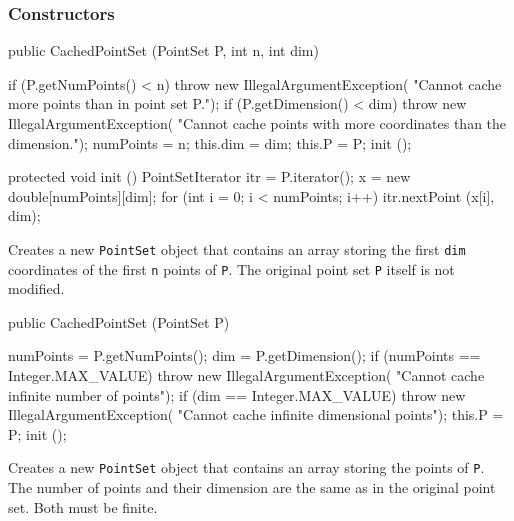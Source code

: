 \subsubsection*{Constructors}
\begin{code}

   public CachedPointSet (PointSet P, int n, int dim) \begin{hide} {
      if (P.getNumPoints() < n)
         throw new IllegalArgumentException(
            "Cannot cache more points than in point set P.");
      if (P.getDimension() < dim)
         throw new IllegalArgumentException(
            "Cannot cache points with more coordinates than the dimension.");
      numPoints = n;
      this.dim = dim;
      this.P = P;
      init ();
   }

   protected void init () {
      PointSetIterator itr = P.iterator();
      x = new double[numPoints][dim];
      for (int i = 0; i < numPoints; i++)
         itr.nextPoint (x[i], dim);
   }\end{hide}
\end{code}
 \begin{tabb}
   Creates a new \texttt{PointSet} object that contains an array storing
   the first \texttt{dim} coordinates of the first \texttt{n} points of \texttt{P}.
   The original point set \texttt{P} itself is not modified.
 \end{tabb}
\begin{htmlonly}
\end{htmlonly}
\begin{code}

   public CachedPointSet (PointSet P) \begin{hide} {
      numPoints = P.getNumPoints();
      dim = P.getDimension();
      if (numPoints == Integer.MAX_VALUE)
         throw new IllegalArgumentException(
            "Cannot cache infinite number of points");
      if (dim == Integer.MAX_VALUE)
         throw new IllegalArgumentException(
            "Cannot cache infinite dimensional points");
      this.P = P;
      init ();
   }\end{hide}
\end{code}
 \begin{tabb}
   Creates a new \texttt{PointSet} object that contains an array storing
   the points of \texttt{P}.
   The number of points and their dimension are the same as in the
   original point set.  Both must be finite.
 \end{tabb}
\begin{htmlonly}
\end{htmlonly}


